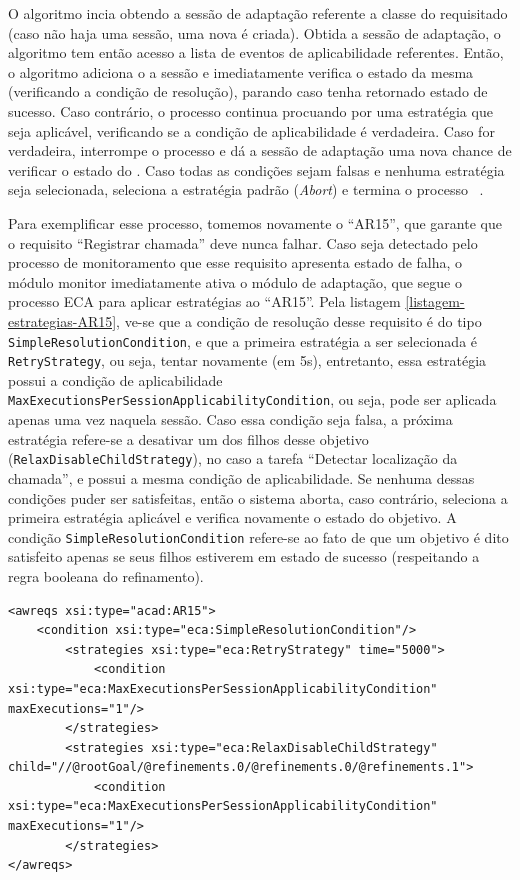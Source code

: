 O algoritmo incia obtendo a sessão de adaptação referente a classe do \awreq requisitado (caso não haja uma sessão, uma nova é criada). Obtida a sessão de adaptação, o algoritmo tem então acesso a lista de eventos de aplicabilidade referentes. Então, o algoritmo adiciona o \awreq a sessão e imediatamente verifica o estado da mesma (verificando a condição de resolução), parando caso tenha retornado estado de sucesso. Caso contrário, o processo continua procuando por uma estratégia que seja aplicável, verificando se a condição de aplicabilidade é verdadeira. Caso for verdadeira, interrompe o processo e dá a sessão de adaptação uma nova chance de verificar o estado do \awreq. Caso todas as condições sejam falsas e nenhuma estratégia seja selecionada, seleciona a estratégia padrão (\textit{Abort}) e termina o processo ~\cite{tesevitor}. 

Para exemplificar esse processo, tomemos novamente o \awreq ``AR15'', que garante que o requisito ``Registrar chamada'' deve nunca falhar. Caso seja detectado pelo processo de monitoramento que esse requisito apresenta estado de falha, o módulo monitor imediatamente ativa o módulo de adaptação, que segue o processo ECA para aplicar estratégias ao ``AR15''. Pela listagem \ref{listagem-estrategias-AR15}, ve-se que a condição de resolução desse requisito é do tipo \texttt{SimpleResolutionCondition}, e que a primeira estratégia a ser selecionada é \texttt{RetryStrategy}, ou seja, tentar novamente (em 5s), entretanto, essa estratégia possui a condição de aplicabilidade \texttt{MaxExecutionsPerSessionApplicabilityCondition}, ou seja, pode ser aplicada apenas uma vez naquela sessão. Caso essa condição seja falsa, a próxima estratégia refere-se a desativar um dos filhos desse objetivo (\texttt{RelaxDisableChildStrategy}), no caso a tarefa ``Detectar localização da chamada'', e possui a mesma condição de aplicabilidade. Se nenhuma dessas condições puder ser satisfeitas, então o sistema aborta, caso contrário, seleciona a primeira estratégia aplicável e verifica novamente o estado do objetivo. A condição \texttt{SimpleResolutionCondition} refere-se ao fato de que um objetivo é dito satisfeito apenas se seus filhos estiverem em estado de sucesso (respeitando a regra booleana do refinamento). 

\begin{lstlisting}
<awreqs xsi:type="acad:AR15">										
	<condition xsi:type="eca:SimpleResolutionCondition"/>
		<strategies xsi:type="eca:RetryStrategy" time="5000">
			<condition xsi:type="eca:MaxExecutionsPerSessionApplicabilityCondition" maxExecutions="1"/>
		</strategies>
		<strategies xsi:type="eca:RelaxDisableChildStrategy" child="//@rootGoal/@refinements.0/@refinements.0/@refinements.1">
			<condition xsi:type="eca:MaxExecutionsPerSessionApplicabilityCondition" maxExecutions="1"/>
		</strategies>
</awreqs>
\end{lstlisting}

